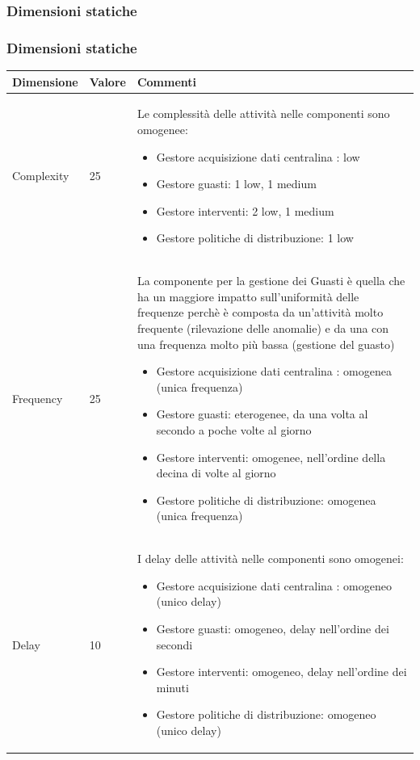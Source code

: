 \documentclass{beamer}
\begin{document}
	\subsubsection{Dimensioni statiche}
		\begin{frame}[allowframebreaks]
		\frametitle{Dimensioni statiche}			
		\begin{center}
			\begin{table}
				\tiny
				\centering
				{\renewcommand{\arraystretch}{1.2}
					
					\begin{tabular}{|M{0.1\textwidth}|M{0.1\textwidth}|p{.6\textwidth}|}
						\hline
						Dimensione & Valore & Commenti \\
						\hline
						Complexity & 25 & Le complessità delle attività nelle componenti sono omogenee:
						\begin{itemize}
								\item Gestore acquisizione dati centralina : low
								\item Gestore guasti: 1 low, 1 medium
								\item Gestore interventi: 2 low, 1 medium
								\item Gestore politiche di distribuzione: 1 low
						\end{itemize} \\
						Frequency & 25 & La componente per la gestione dei Guasti è quella che ha un maggiore impatto sull'uniformità delle frequenze perchè è composta da un'attività molto frequente (rilevazione delle anomalie) e da una con una frequenza molto più bassa (gestione del guasto)
						\begin{itemize}
							\item Gestore acquisizione dati centralina : omogenea (unica frequenza)
							\item Gestore guasti: eterogenee, da una volta al secondo a poche volte al giorno
							\item Gestore interventi: omogenee, nell'ordine della decina di volte al giorno
							\item Gestore politiche di distribuzione:  omogenea (unica frequenza)
						\end{itemize} \\
						Delay & 10 & I delay delle attività nelle componenti sono omogenei:
						\begin{itemize}
							\item Gestore acquisizione dati centralina : omogeneo (unico delay)
							\item Gestore guasti: omogeneo, delay nell'ordine dei secondi
							\item Gestore interventi: omogeneo, delay nell'ordine dei minuti
							\item Gestore politiche di distribuzione: omogeneo (unico delay)
						\end{itemize} \\
						\hline
				\end{tabular}}
			\end{table}
		\end{center}
	

\end{frame}
\end{document}
